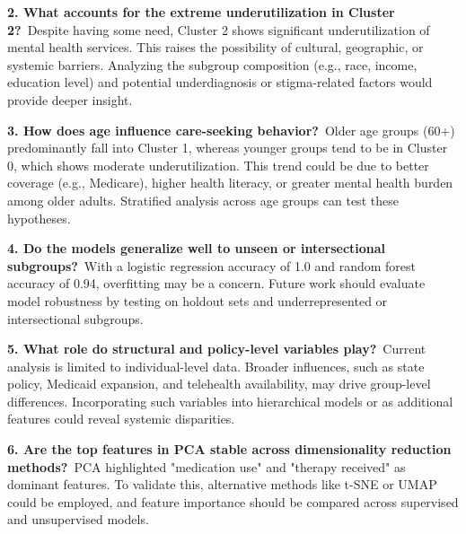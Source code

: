 \documentclass{article}
\begin{document}
\vspace{0.1cm}

\textbf{2. What accounts for the extreme underutilization in Cluster 2?}\
Despite having some need, Cluster 2 shows significant underutilization of mental health services. This raises the possibility of cultural, geographic, or systemic barriers. Analyzing the subgroup composition (e.g., race, income, education level) and potential underdiagnosis or stigma-related factors would provide deeper insight.

\vspace{0.1cm}

\textbf{3. How does age influence care-seeking behavior?}\
Older age groups (60+) predominantly fall into Cluster 1, whereas younger groups tend to be in Cluster 0, which shows moderate underutilization. This trend could be due to better coverage (e.g., Medicare), higher health literacy, or greater mental health burden among older adults. Stratified analysis across age groups can test these hypotheses.

\vspace{0.1cm}

\textbf{4. Do the models generalize well to unseen or intersectional subgroups?}\
With a logistic regression accuracy of 1.0 and random forest accuracy of 0.94, overfitting may be a concern. Future work should evaluate model robustness by testing on holdout sets and underrepresented or intersectional subgroups.

\vspace{0.1cm}

\textbf{5. What role do structural and policy-level variables play?}\
Current analysis is limited to individual-level data. Broader influences, such as state policy, Medicaid expansion, and telehealth availability, may drive group-level differences. Incorporating such variables into hierarchical models or as additional features could reveal systemic disparities.

\vspace{0.1cm}

\textbf{6. Are the top features in PCA stable across dimensionality reduction methods?}\
PCA highlighted "medication use" and "therapy received" as dominant features. To validate this, alternative methods like t-SNE or UMAP could be employed, and feature importance should be compared across supervised and unsupervised models.
\end{document}
